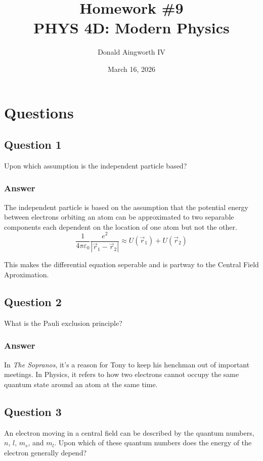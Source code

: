 \documentclass[12pt]{article}
\title{
    Homework \#9
    \\  \small
    PHYS 4D: Modern Physics
    }
\author{Donald Aingworth IV}
\date{March 16, 2026}
\begin{document}
    \maketitle

    \section{Questions}
        \small
        \subsection{Question 1}
            Upon which assumption is the independent particle based?

            \subsubsection{Answer}
                The independent particle is based on the assumption that the potential energy between electrons orbiting an atom can be approximated to two separable components each dependent on the location of one atom but not the other.
                \begin{equation}
                    \frac{1}{4\pi\varepsilon_0}\frac{e^2}{\left| \vec{r}_1 - \vec{r}_2 \right|} \approx U(\vec{r}_1) + U(\vec{r}_2)
                \end{equation}

                This makes the differential equation seperable and is partway to the Central Field Aproximation.
            
        \subsection{Question 2}
            What is the Pauli exclusion principle?

            \subsubsection{Answer}
                In \textit{The Sopranos}, it's a reason for Tony to keep his henchman out of important meetings.
                In Physics, it refers to how two electrons cannot occupy the same quantum state around an atom at the same time.
            
        \subsection{Question 3}
            An electron moving in a central field can be described by the quantum numbers, $n$, $l$, $m_s$, and $m_l$. 
            Upon which of these quantum numbers does the energy of the electron generally depend?
\end{document}
